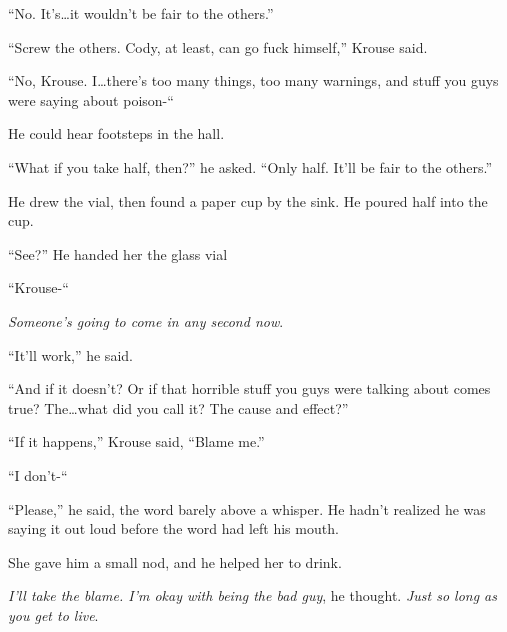 ``No.  It's\ldots it wouldn't be fair to the others.''



``Screw the others.  Cody, at least, can go fuck himself,'' Krouse said.



``No, Krouse.  I\ldots there's too many things, too many warnings, and stuff you guys were saying about poison-``



He could hear footsteps in the hall.



``What if you take half, then?'' he asked.  ``Only half.  It'll be fair to the others.''



He drew the vial, then found a paper cup by the sink.  He poured half into the cup.



``See?''  He handed her the glass vial



``Krouse-``



\emph{Someone's going to come in any second now}.



``It'll work,'' he said.



``And if it doesn't?  Or if that horrible stuff you guys were talking about comes true?  The\ldots what did you call it?  The cause and effect?''



``If it happens,'' Krouse said, ``Blame me.''



``I don't-``



``Please,'' he said, the word barely above a whisper.  He hadn't realized he was saying it out loud before the word had left his mouth.



She gave him a small nod, and he helped her to drink.



\emph{I'll take the blame.  I'm okay with being the bad guy}, he thought.  \emph{Just so long as you get to live}.






